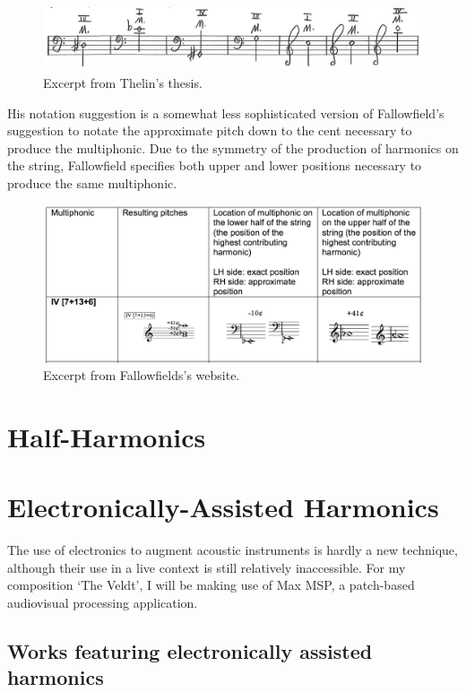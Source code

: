 \begin{figure}
    \includegraphics[width=\linewidth]{./resources/thelinMultiphonicNotation.png}
    \caption{Excerpt from Thelin's thesis.}
  \label{fig:Excerpt from Thelin's thesis}
  \end{figure}
His notation suggestion is a somewhat less sophisticated version of Fallowfield's suggestion to notate the approximate pitch down to the cent necessary to produce the multiphonic. Due to the symmetry of the production of harmonics on the string, Fallowfield specifies both upper and lower positions necessary to produce the same multiphonic.\autocite[index/the-string/multiphonics-and-other-multiple-sounds/fingeringcharts.html]{fallowfieldCelloMap}
\begin{figure}
    \includegraphics[width=\linewidth]{./resources/fallowfieldMultiphonicFingering.png}
    \caption{Excerpt from Fallowfields's website.}
\label{fig:Excerpt from Fallowfields's website}
  \end{figure}

\section{Half-Harmonics}


\section{Electronically-Assisted Harmonics}
The use of electronics to augment acoustic instruments is hardly a new technique, although their use in a live context is still relatively inaccessible. For my composition `The Veldt', I will be making use of Max MSP, a patch-based audiovisual processing application. 

\subsection{Works featuring electronically assisted harmonics}
\lipsum[4]
